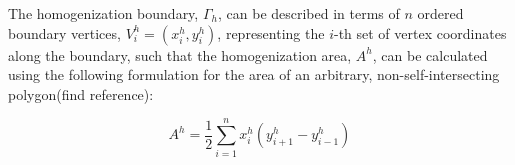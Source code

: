 

The homogenization boundary, $\Gamma_{h}$, can be described in terms of $n$ ordered boundary vertices, $V_{i}^{h}=(x_{i}^{h},y_{i}^{h})$, representing the $i$-th set of vertex coordinates along the boundary, such that the homogenization area, $A^{h}$, can be calculated using the following formulation for the area of an arbitrary, non-self-intersecting polygon(find reference): 

\begin{equation}
A^{h}=\dfrac{1}{2}\sum_{i=1}^{n}x_{i}^{h}(y_{i+1}^{h}-y_{i-1}^{h})
\label{eqn:hom1}
\end{equation}




